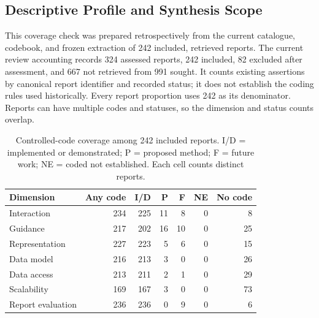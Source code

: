 \documentclass[manuscript,review,screen]{acmart}
\begin{document}
\subsection{Descriptive Profile and Synthesis Scope}

This coverage check was prepared retrospectively from the current catalogue, codebook, and frozen extraction of 242 included, retrieved reports. The current review accounting records 324 assessed reports, 242 included, 82 excluded after assessment, and 667 not retrieved from 991 sought. It counts existing assertions by canonical report identifier and recorded status; it does not establish the coding rules used historically. Every report proportion uses 242 as its denominator. Reports can have multiple codes and statuses, so the dimension and status counts overlap.

\begin{table}[htbp]

\centering\small

\caption{Controlled-code coverage among 242 included reports. I/D = implemented or demonstrated; P = proposed method; F = future work; NE = coded not established. Each cell counts distinct reports.}

\label{tab:retrospective-code-coverage}

\begin{tabular}{@{}lrrrrrr@{}}

\toprule Dimension & Any code & I/D & P & F & NE & No code\\\midrule

Interaction & 234 & 225 & 11 & 8 & 0 & 8\\

Guidance & 217 & 202 & 16 & 10 & 0 & 25\\

Representation & 227 & 223 & 5 & 6 & 0 & 15\\

Data model & 216 & 213 & 3 & 0 & 0 & 26\\

Data access & 213 & 211 & 2 & 1 & 0 & 29\\

Scalability & 169 & 167 & 3 & 0 & 0 & 73\\

Report evaluation & 236 & 236 & 0 & 9 & 0 & 6\\

\bottomrule\end{tabular}

\end{table}
\end{document}
